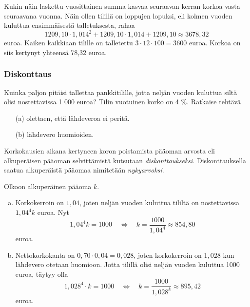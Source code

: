 \documentclass{beamer}
\begin{document}
\begin{frame}
    \begin{ratkaisu}
        Kukin näin laskettu vuosittainen summa kasvaa seuraavan kerran korkoa vasta seuraavana vuonna.
        \pause
        Näin ollen tilillä on loppujen lopuksi, eli kolmen vuoden kuluttua ensimmäisestä talletuksesta, rahaa \pause
        \[
            1209,10\cdot 1,014^2+1209,10\cdot1,014+1209,10\approx 3678,32
        \]
        euroa. Kaiken kaikkiaan tilille on talletettu \(3\cdot12\cdot100 = 3600\) euroa. Korkoa on siis kertynyt yhteensä 78,32 euroa.
    \end{ratkaisu}
\end{frame}

\begin{frame}
    \frametitle{Diskonttaus}
    \pause
    \begin{esim}
        Kuinka paljon pitäisi tallettaa pankkitilille, jotta neljän vuoden kuluttua siltä olisi nostettavissa 1 000 euroa? 
        Tilin vuotuinen korko on 4 \%. Ratkaise tehtävä
        \begin{enumerate}
            \item[(a)] olettaen, että lähdeveroa ei peritä.
            \item[(b)] lähdevero huomioiden.
        \end{enumerate}
    \end{esim}
    \pause
    Korkokausien aikana kertyneen koron poistamista pääoman arvosta eli alkuperäisen pääoman selvittämistä kutsutaan 
    \emph{diskonttaukseksi}.
    \pause
    Diskonttauksella saatua alkuperäistä pääomaa nimitetään \emph{nykyarvoksi}.
\end{frame}

\begin{frame}
    \begin{ratkaisu}
        Olkoon alkuperäinen pääoma \(k\).
        \begin{enumerate}[(a)]
            \item Korkokerroin on \(1,04\), joten neljän vuoden kuluttua tililtä on nostettavissa \(1,04^4k\) euroa.
                Nyt
                \[
                    1,04^4k = 1000\quad\Leftrightarrow\quad k = \frac{1000}{1,04^4}\approx 854,80
                \]
                euroa.
            \item Nettokorkokanta on \(0,70\cdot0,04=0,028\), joten korkokerroin on \(1,028\) kun lähdevero otetaan huomioon.
                Jotta tilillä olisi neljän vuoden kuluttua 1000 euroa, täytyy olla
                \[
                    1,028^4\cdot k = 1000\quad\Leftrightarrow\quad k = \frac{1000}{1,028^k}\approx 895,42
                \]
                euroa.
        \end{enumerate}
    \end{ratkaisu}
\end{frame}
\end{document}
